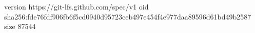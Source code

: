 version https://git-lfs.github.com/spec/v1
oid sha256:fde76fdf906fb6f5cd0940d95723ceb497e454f4e977daa89596d61bd49b2587
size 87544
